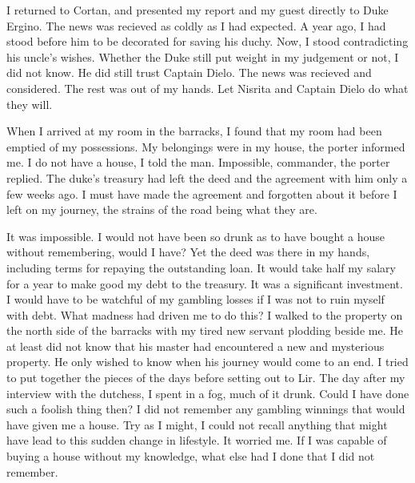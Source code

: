 \documentclass{article}
\begin{document}
I returned to Cortan, and presented my report and my guest directly to Duke Ergino. The news was recieved as coldly as I had expected. A year ago, I had stood before him to be decorated for saving his duchy. Now, I stood contradicting his uncle's wishes. Whether the Duke still put weight in my judgement or not, I did not know. He did still trust Captain Dielo. The news was recieved and considered. The rest was out of my hands. Let Nisrita and Captain Dielo do what they will. 

When I arrived at my room in the barracks, I found that my room had been emptied of my possessions. My belongings were in my house, the porter informed me. I do not have a house, I told the man. Impossible, commander, the porter replied. The duke's treasury had left the deed and the agreement with him only a few weeks ago. I must have made the agreement and forgotten about it before I left on my journey, the strains of the road being what they are. 

It was impossible. I would not have been so drunk as to have bought a house without remembering, would I have? Yet the deed was there in my hands, including terms for repaying the outstanding loan. It would take half my salary for a year to make good my debt to the treasury. It was a significant investment. I would have to be watchful of my gambling losses if I was not to ruin myself with debt. What madness had driven me to do this? I walked to the property on the north side of the barracks with my tired new servant plodding beside me. He at least did not know that his master had encountered a new and mysterious property. He only wished to know when his journey would come to an end. I tried to put together the pieces of the days before setting out to Lir. The day after my interview with the dutchess, I spent in a fog, much of it drunk. Could I have done such a foolish thing then? I did not remember any gambling winnings that would have given me a house. Try as I might, I could not recall anything that might have lead to this sudden change in lifestyle. It worried me. If I was capable of  buying a house without my knowledge, what else had I done that I did not remember.
\end{document}
